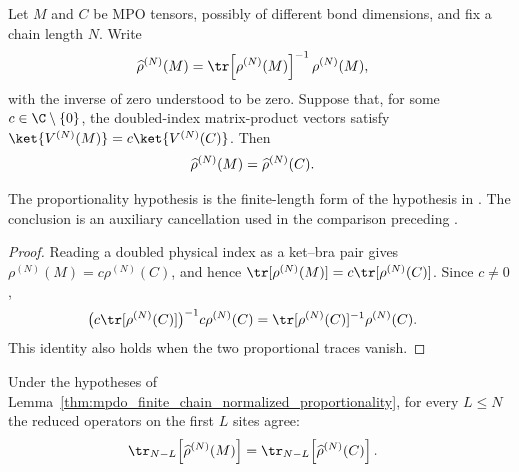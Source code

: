 \begin{lemma}
    \label{thm:mpdo_finite_chain_normalized_proportionality}
    \leanok
    Let $M$ and $C$ be MPO tensors, possibly of different bond dimensions,
    and fix a chain length $N$. Write
    \begin{align}
        \widehat\rho^{(N)}(M)
         & =
        \tr\!\left[\rho^{(N)}(M)\right]^{-1}\rho^{(N)}(M),
        \notag
    \end{align}
    with the inverse of zero understood to be zero. Suppose that, for some
    $c\in\C\setminus\{0\}$, the doubled-index matrix-product vectors satisfy
    $\ket{V^{(N)}(M)}=c\ket{V^{(N)}(C)}$. Then
    \begin{align}
        \widehat\rho^{(N)}(M)
         & =
        \widehat\rho^{(N)}(C).
        \notag
    \end{align}

    The proportionality hypothesis is the finite-length form of the
    hypothesis in \cite[Theorem~2.10]{Cirac2016MPDO_arXiv}. The conclusion is
    an auxiliary cancellation used in the comparison preceding
    \cite[Appendix~C.2, lines~1597--1619]{Cirac2016MPDO_arXiv}.
\end{lemma}

\begin{proof}\leanok
    Reading a doubled physical index as a ket--bra pair gives
    $\rho^{(N)}(M)=c\rho^{(N)}(C)$, and hence
    $\tr[\rho^{(N)}(M)]=c\tr[\rho^{(N)}(C)]$. Since $c\ne0$,
    \begin{align}
        \bigl(c\tr[\rho^{(N)}(C)]\bigr)^{-1}
        c\rho^{(N)}(C)
         & =
        \tr[\rho^{(N)}(C)]^{-1}\rho^{(N)}(C).
        \notag
    \end{align}
    This identity also holds when the two proportional traces vanish.
\end{proof}

\begin{lemma}
    \label{thm:mpdo_finite_chain_reduced_proportionality}
    \leanok
    Under the hypotheses of
    Lemma~\ref{thm:mpdo_finite_chain_normalized_proportionality}, for every
    $L\leq N$ the reduced operators on the first $L$ sites agree:
    \begin{align}
        \tr_{N-L}\!\left[\widehat\rho^{(N)}(M)\right]
         & =
        \tr_{N-L}\!\left[\widehat\rho^{(N)}(C)\right].
        \notag
    \end{align}
\end{lemma}

